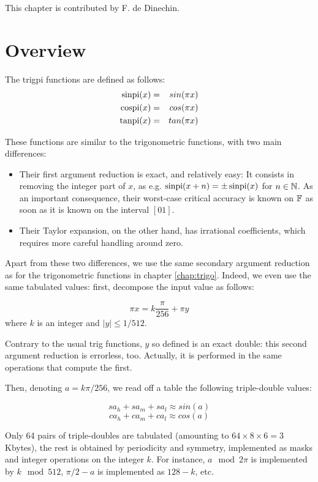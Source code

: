 This chapter is contributed by F. de Dinechin.


\section{Overview}
The trigpi functions are defined as follows:
\begin{eqnarray}
 \operatorname{sinpi}(x) &=& sin(\pi x) \\
 \operatorname{cospi}(x) &=& cos(\pi x) \\
 \operatorname{tanpi}(x) &=& tan(\pi x)  
\end{eqnarray}

These functions are similar to the trigonometric functions, with
two main differences:
\begin{itemize}
\item Their first argument reduction is exact, and relatively easy: It
  consists in removing the integer part of $x$, as e.g.
  $\operatorname{sinpi}(x+n)=\pm \operatorname{sinpi}(x)$ for $n\in\mathbb {N}$. As an important consequence, their
  worst-case critical accuracy is known on $\mathbb {F}$ as soon as it is known
  on  the interval $[0 1]$.
\item Their Taylor expansion, on the other hand, has irrational
  coefficients, which requires more careful handling around zero.
\end{itemize}

Apart from these two differences, we use the same secondary argument
reduction as for the trigonometric functions in chapter
\ref{chap:trigo}. Indeed, we even use the same tabulated values:
first, decompose the input value as follows: 

\begin{equation}
  \pi x = k\frac{\pi}{256} + \pi y\label{eq:trigpiargred}
\end{equation}
where  $k$  is an integer and  $ |y| \leq {1}/{512}$.

Contrary to the usual trig functions, $y$ so defined is an exact
double: this second argument reduction is errorless, too. Actually, it
is performed in the same operations that compute the first.

Then, denoting $a=k\pi/256$, 
we read off a table the following triple-double values: 

$$sa_h+sa_m+sa_l \approx sin(a)$$
$$ca_h+ca_m+ca_l \approx cos(a)$$

Only 64 pairs of triple-doubles  are tabulated (amounting to
$64\times 8 \times 6 = 3$ Kbytes), the rest is obtained by
periodicity and symmetry, implemented as masks and integer operations
on the integer $k$. For instance,  $a\mod 2\pi$ is implemented by $k\mod 512$,
$\pi/2-a$ is implemented as $128-k$, etc.


